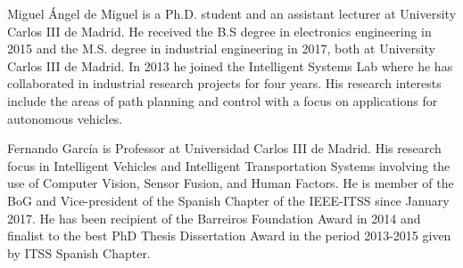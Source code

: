 \documentclass[journal]{IEEEtran}
\begin{document}
\begin{IEEEbiography}
{Miguel \'Angel de Miguel}
is a Ph.D. student and an assistant lecturer at University Carlos III de Madrid.
He received the B.S degree in electronics engineering in 2015 and the M.S. 
degree in industrial
engineering in 2017, both at University Carlos III de Madrid.
In 2013 he joined the Intelligent Systems Lab where he has collaborated
in industrial research projects for four years.
His research interests include the areas of path planning and control 
with a focus on applications for autonomous vehicles.
\end{IEEEbiography}


\begin{IEEEbiography}
    {Fernando Garc\'ia} is Professor at Universidad Carlos III de Madrid. His 
    research focus in Intelligent Vehicles and Intelligent 
    Transportation Systems involving the use of Computer Vision, Sensor Fusion, 
    and Human Factors. He 
    is member of the BoG and Vice-president of the Spanish Chapter of the 
    IEEE-ITSS since January 2017. He has been recipient of the Barreiros 
    Foundation Award %
    in 2014 and finalist to the best PhD Thesis Dissertation Award in the 
    period 2013-2015 given by ITSS Spanish Chapter.   

\end{IEEEbiography}
\end{document}
